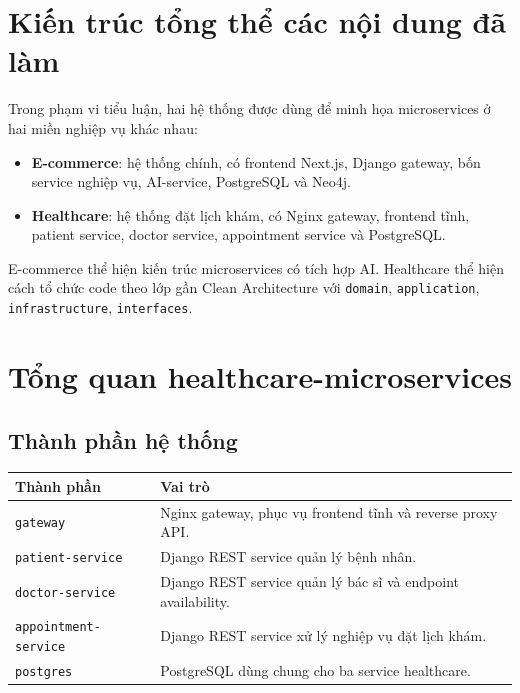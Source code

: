 \documentclass[12pt,a4paper]{report}
\begin{document}
\section{Kiến trúc tổng thể các nội dung đã làm}
Trong phạm vi tiểu luận, hai hệ thống được dùng để minh họa microservices ở hai miền nghiệp vụ khác nhau:
\begin{itemize}
  \item \textbf{E-commerce}: hệ thống chính, có frontend Next.js, Django gateway, bốn service nghiệp vụ, AI-service, PostgreSQL và Neo4j.
  \item \textbf{Healthcare}: hệ thống đặt lịch khám, có Nginx gateway, frontend tĩnh, patient service, doctor service, appointment service và PostgreSQL.
\end{itemize}

E-commerce thể hiện kiến trúc microservices có tích hợp AI. Healthcare thể hiện cách tổ chức code theo lớp gần Clean Architecture với \texttt{domain}, \texttt{application}, \texttt{infrastructure}, \texttt{interfaces}.

\section{Tổng quan healthcare-microservices}
\subsection{Thành phần hệ thống}
\begin{longtable}{p{3.4cm}p{10cm}}
\toprule
\textbf{Thành phần} & \textbf{Vai trò} \\
\midrule
\texttt{gateway} & Nginx gateway, phục vụ frontend tĩnh và reverse proxy API. \\
\texttt{patient-service} & Django REST service quản lý bệnh nhân. \\
\texttt{doctor-service} & Django REST service quản lý bác sĩ và endpoint availability. \\
\texttt{appointment-service} & Django REST service xử lý nghiệp vụ đặt lịch khám. \\
\texttt{postgres} & PostgreSQL dùng chung cho ba service healthcare. \\
\bottomrule
\end{longtable}
\end{document}
